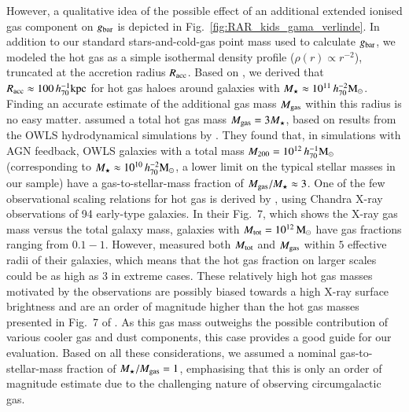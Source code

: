 \documentclass{aa}
\newcommand{\homsun}{\,h_{70}^{-1} {\rm M_\odot}}
\newcommand{\hmsun}{\,h_{70}^{-2} {\rm M_\odot}}
\newcommand{\msun}{\,{\rm M_\odot}}
\newcommand{\hkpc}{\,h_{70}^{-1}{\rm{kpc}} }
\newcommand{\un}[1]{_{\rm #1}}
\begin{document}
However, a qualitative idea of the possible effect of an additional extended ionised gas component on $g\un{bar}$ is depicted in Fig.~\ref{fig:RAR_kids_gama_verlinde}. In addition to our standard stars-and-cold-gas point mass used to calculate $g\un{bar}$, we modeled the hot gas as a simple isothermal density profile ($\rho(r) \propto r^{-2}$), truncated at the accretion radius $R\un{acc}$. Based on \cite{valentijn1988}, we derived that $R\un{acc} \approx 100 \hkpc$ for hot gas haloes around galaxies with $M_\star \approx 10^{11} \hmsun$. Finding an accurate estimate of the additional gas mass $M\un{gas}$ within this radius is no easy matter. \cite{brouwer2017} assumed a total hot gas mass $M\un{gas} = 3 M_\star$, based on results from the OWLS hydrodynamical simulations by \cite{fedeli2014b}. They found that, in simulations with AGN feedback, OWLS galaxies with a total mass $M_{200} = 10^{12} \homsun$ (corresponding to $M_\star \approx 10^{10} \hmsun$, a lower limit on the typical stellar masses in our sample) have a gas-to-stellar-mass fraction of $M\un{gas} / M_\star \approx 3$. One of the few observational scaling relations for hot gas is derived by \cite{babyk2018}, using Chandra X-ray observations of 94 early-type galaxies. In their Fig.~7, which shows the X-ray gas mass versus the total galaxy mass, galaxies with $M\un{tot} = 10^{12} \msun$ have gas fractions ranging from $0.1 - 1$. However, \cite{babyk2018} measured both $M\un{tot}$ and $M\un{gas}$ within $5$ effective radii of their galaxies, which means that the hot gas fraction on larger scales could be as high as $3$ in extreme cases. These relatively high hot gas masses motivated by the \cite{babyk2018} observations are possibly biased towards a high X-ray surface brightness and are an order of magnitude higher than the hot gas masses presented in Fig.~7 of \cite{tumlinson2017}. As this gas mass outweighs the possible contribution of various cooler gas and dust components, this case provides a good guide for our evaluation. Based on all these considerations, we assumed a nominal gas-to-stellar-mass fraction of $M_\star/M\un{gas} = 1$, emphasising that this is only an order of magnitude estimate due to the challenging nature of observing circumgalactic gas.
\end{document}
